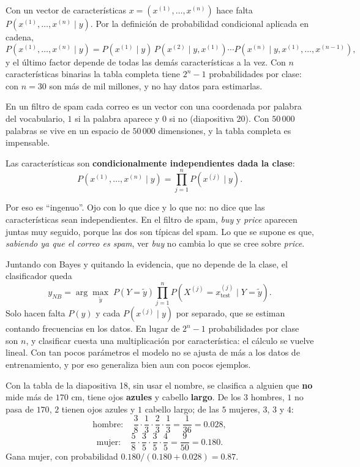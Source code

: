\documentclass[11pt,letterpaper]{article}
\begin{document}
Con un vector de características $x = (x^{(1)}, \dots, x^{(n)})$ hace
falta $P(x^{(1)}, \dots, x^{(n)} \mid y)$. Por la definición de
probabilidad condicional aplicada en cadena,
\[
    P(x^{(1)}, \dots, x^{(n)} \mid y)
    = P(x^{(1)} \mid y)\, P(x^{(2)} \mid y, x^{(1)}) \cdots
      P(x^{(n)} \mid y, x^{(1)}, \dots, x^{(n-1)}) ,
\]
y el último factor depende de todas las demás características a la
vez. Con $n$ características binarias la tabla completa tiene
$2^n - 1$ probabilidades por clase: con $n = 30$ son más de mil
millones, y no hay datos para estimarlas.

En un filtro de spam cada correo es un vector con una coordenada por
palabra del vocabulario, $1$ si la palabra aparece y $0$ si no
(diapositiva 20). Con $50\,000$ palabras se vive en un espacio de
$50\,000$ dimensiones, y la tabla completa es impensable.

\begin{definicion}
    Las características son \textbf{condicionalmente independientes
    dada la clase}:
    \[
        P(x^{(1)}, \dots, x^{(n)} \mid y)
        = \prod_{j=1}^{n} P(x^{(j)} \mid y) .
    \]
\end{definicion}

Por eso es ``ingenuo''. Ojo con lo que dice y lo que no: no dice que
las características sean independientes. En el filtro de spam,
\textit{buy} y \textit{price} aparecen juntas muy seguido, porque las
dos son típicas del spam. Lo que se supone es que, \emph{sabiendo ya
que el correo es spam}, ver \textit{buy} no cambia lo que se cree
sobre \textit{price}.

Juntando con Bayes y quitando la evidencia, que no depende de la
clase, el clasificador queda
\[
    y_{NB} = \arg\max_{\tilde{y}}\; P(Y = \tilde{y})
    \prod_{j=1}^{n} P\!\left(X^{(j)} = x_{\text{test}}^{(j)}
    \mid Y = \tilde{y}\right) .
\]
Solo hacen falta $P(y)$ y cada $P(x^{(j)} \mid y)$ por separado, que
se estiman contando frecuencias en los datos. En lugar de $2^n - 1$
probabilidades por clase son $n$, y clasificar cuesta una
multiplicación por característica: el cálculo se vuelve lineal. Con
tan pocos parámetros el modelo no se ajusta de más a los datos de
entrenamiento, y por eso generaliza bien aun con pocos ejemplos.

\begin{ejemplo}
    Con la tabla de la diapositiva 18, sin usar el nombre, se clasifica
    a alguien que \textbf{no} mide más de $170$ cm, tiene ojos
    \textbf{azules} y cabello \textbf{largo}. De los $3$ hombres, $1$
    no pasa de $170$, $2$ tienen ojos azules y $1$ cabello largo; de
    las $5$ mujeres, $3$, $3$ y $4$:
    \[
        \text{hombre}: \quad \frac{3}{8} \cdot \frac{1}{3} \cdot
        \frac{2}{3} \cdot \frac{1}{3} = \frac{1}{36} = 0.028 ,
    \]
    \[
        \text{mujer}: \quad \frac{5}{8} \cdot \frac{3}{5} \cdot
        \frac{3}{5} \cdot \frac{4}{5} = \frac{9}{50} = 0.180 .
    \]
    Gana mujer, con probabilidad $0.180 / (0.180 + 0.028) = 0.87$.
\end{ejemplo}
\end{document}
